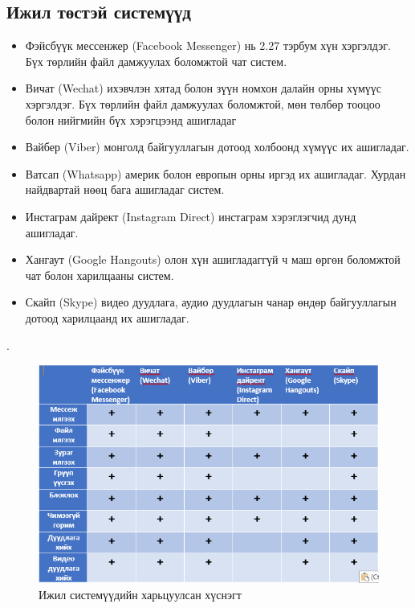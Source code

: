 \subsection{Ижил төстэй системүүд}
\begin{itemize}
	\item Фэйсбүүк мессенжер (Facebook Messenger) нь 2.27 тэрбум хүн хэргэлдэг. Бүх төрлийн файл дамжуулах боломжтой чат систем.
	\item Вичат (Wechat) ихэвчлэн хятад болон зүүн номхон далайн орны хүмүүс хэргэлдэг. Бүх төрлийн файл дамжуулах боломжтой, мөн төлбөр тооцоо болон нийгмийн бүх хэрэгцээнд ашигладаг
	\item Вайбер (Viber) монголд байгууллагын дотоод холбоонд хүмүүс их ашигладаг.
	\item Ватсап (Whatsapp) америк болон европын орны иргэд их ашигладаг. Хурдан найдвартай нөөц бага ашигладаг систем.
	\item Инстаграм дайрект (Instagram Direct) инстаграм хэрэглэгчид дунд ашигладаг.
	\item Хангаут (Google Hangouts) олон хүн ашигладаггүй ч маш өргөн боломжтой чат болон харилцааны систем.
	\item Скайп (Skype) видео дуудлага, аудио дуудлагын чанар өндөр байгууллагын дотоод харилцаанд их ашигладаг. 
\end{itemize}.
\begin{figure}[htbp]
	\centering
	\includegraphics[scale=0.9]{Chart/Chart8}
	\caption[Хэрэглэгчийн судалгаа]{Ижил системүүдийн харьцуулсан хүснэгт}
	\label{fig:Chart3}
\end{figure}

